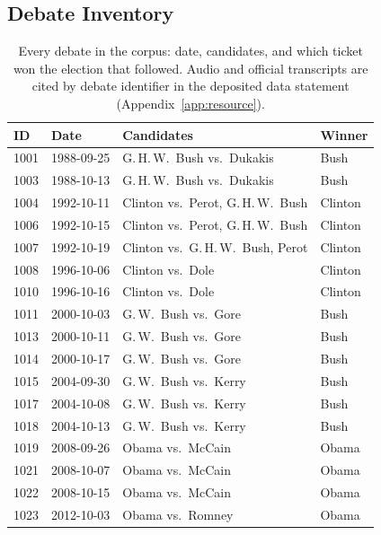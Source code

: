 \documentclass[pdflatex,sn-mathphys-num]{sn-jnl}%
\begin{document}
\begin{appendices}

\section{Debate Inventory}
\label{app:inventory}

\begin{table}[h]
\caption{Every debate in the corpus: date, candidates, and which ticket won
the election that followed. Audio and official transcripts are cited by
debate identifier in the deposited data statement (Appendix~\ref{app:resource}).}
\label{tab:inventory}
\centering
\scriptsize
\setlength{\tabcolsep}{2pt}
\begin{tabular}{llp{}l}
\toprule
ID & Date & Candidates & Winner \\
\midrule
1001 & 1988-09-25 & G.\,H.\,W.\ Bush vs.\ Dukakis & Bush \\
1003 & 1988-10-13 & G.\,H.\,W.\ Bush vs.\ Dukakis & Bush \\
1004 & 1992-10-11 & Clinton vs.\ Perot, G.\,H.\,W.\ Bush & Clinton \\
1006 & 1992-10-15 & Clinton vs.\ Perot, G.\,H.\,W.\ Bush & Clinton \\
1007 & 1992-10-19 & Clinton vs.\ G.\,H.\,W.\ Bush, Perot & Clinton \\
1008 & 1996-10-06 & Clinton vs.\ Dole & Clinton \\
1010 & 1996-10-16 & Clinton vs.\ Dole & Clinton \\
1011 & 2000-10-03 & G.\,W.\ Bush vs.\ Gore & Bush \\
1013 & 2000-10-11 & G.\,W.\ Bush vs.\ Gore & Bush \\
1014 & 2000-10-17 & G.\,W.\ Bush vs.\ Gore & Bush \\
1015 & 2004-09-30 & G.\,W.\ Bush vs.\ Kerry & Bush \\
1017 & 2004-10-08 & G.\,W.\ Bush vs.\ Kerry & Bush \\
1018 & 2004-10-13 & G.\,W.\ Bush vs.\ Kerry & Bush \\
1019 & 2008-09-26 & Obama vs.\ McCain & Obama \\
1021 & 2008-10-07 & Obama vs.\ McCain & Obama \\
1022 & 2008-10-15 & Obama vs.\ McCain & Obama \\
1023 & 2012-10-03 & Obama vs.\ Romney & Obama \\

\end{tabular}
\end{table}
\end{appendices}
\end{document}
